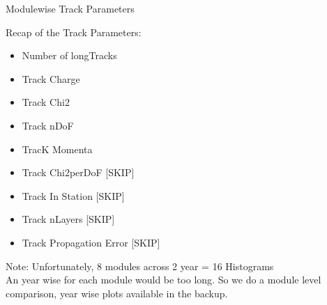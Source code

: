 


\begin{frame}{Modulewise Track Parameters}
    
    Recap of the Track Parameters:
    \begin{itemize}
        \item Number of longTracks
        \item Track Charge
        \item Track Chi2 
        \item Track nDoF
        \item TracK Momenta 
        \item Track Chi2perDoF [SKIP]
        \item Track In Station [SKIP]
        \item Track nLayers [SKIP]
        \item Track Propagation Error [SKIP]
    \end{itemize}
    \vspace{0.3 cm}
    \small{    
    Note: Unfortunately, 8 modules across 2 year = 16 Histograms \\
    An year wise for each module would be too long.
    So we do a module level comparison, year wise plots available in the backup.
    }
\end{frame}




